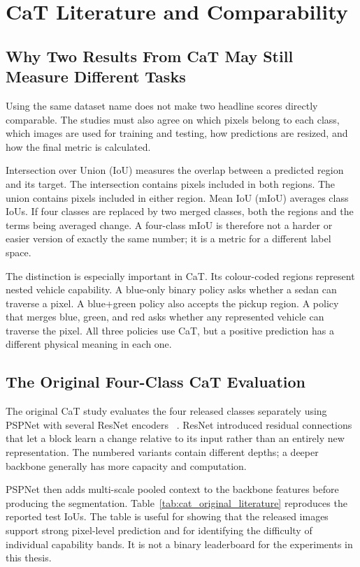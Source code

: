 \section{CaT Literature and Comparability}

\subsection{Why Two Results From CaT May Still Measure Different Tasks}

Using the same dataset name does not make two headline scores directly
comparable. The studies must also agree on which pixels belong to each class,
which images are used for training and testing, how predictions are resized,
and how the final metric is calculated.

Intersection over Union (IoU) measures the overlap between a predicted region
and its target. The intersection contains pixels included in both regions. The
union contains pixels included in either region. Mean IoU (mIoU) averages class
IoUs. If four classes are replaced by two merged classes, both the regions and
the terms being averaged change. A four-class mIoU is therefore not a harder
or easier version of exactly the same number; it is a metric for a different
label space.

The distinction is especially important in CaT. Its colour-coded regions
represent nested vehicle capability. A blue-only binary policy asks whether a
sedan can traverse a pixel. A blue+green policy also accepts the pickup region.
A policy that merges blue, green, and red asks whether any represented vehicle
can traverse the pixel. All three policies use CaT, but a positive prediction
has a different physical meaning in each one.

\subsection{The Original Four-Class CaT Evaluation}

The original CaT study evaluates the four released classes separately using
PSPNet with several ResNet encoders
~\cite{sharma2022cat,zhao2017pspnet,he2016resnet}. ResNet introduced residual
connections that let a block learn a change relative to its input rather than
an entirely new representation. The numbered variants contain different
depths; a deeper backbone generally has more capacity and computation.

PSPNet then adds multi-scale pooled context to the backbone features before
producing the segmentation. Table~\ref{tab:cat_original_literature} reproduces
the reported test IoUs. The table is useful for showing that the released
images support strong pixel-level prediction and for identifying the
difficulty of individual capability bands. It is not a binary leaderboard for
the experiments in this thesis.

